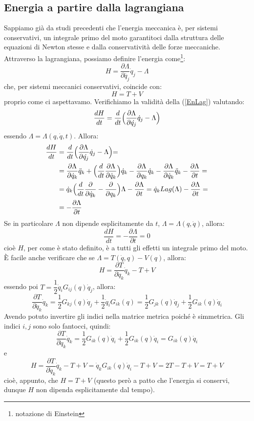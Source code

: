 \documentclass[a4paper,openany]{article}
\begin{document}
	\subsection{Energia a partire dalla lagrangiana}
	Sappiamo già da studi precedenti che l'energia meccanica è, per sistemi conservativi, un integrale primo del moto garantitoci dalla struttura delle equazioni di Newton stesse e dalla conservatività delle forze meccaniche. Attraverso la lagrangiana, possiamo definire l'energia come\footnote{notazione di Einstein}:
	\begin{equation}
		H = \dfrac{\partial \Lambda}{\partial \dot{q_{j}}} \dot{q}_{j} - \Lambda 
		\label{EnLag}
	\end{equation}
	che, per sistemi meccanici conservativi, coincide con:
	$$
	H = T + V
	$$
	proprio come ci aspettavamo. Verifichiamo la validità della (\ref{EnLag}) valutando:
	\begin{align}
		\dfrac{dH}{dt} = \dfrac{d}{dt}\Bigl(\dfrac{\partial \Lambda}{\partial \dot{q_{j}}} \dot{q}_{j} - \Lambda\Bigl)
	\end{align}
	essendo $\Lambda = \Lambda(q,\dot{q},t)$. Allora:
	\begin{align}
		\dfrac{dH}{dt} &= \dfrac{d}{dt}\Bigl(\dfrac{\partial \Lambda}{\partial \dot{q_{j}}} \dot{q}_{j} - \Lambda\Bigl) = \\
		&= \dfrac{\partial \Lambda}{\partial \dot{q}_{k}}\ddot{q}_{k} + \Bigl(\dfrac{d}{dt}\dfrac{\partial \Lambda}{\partial \dot{q}_{k}}\Bigl)\dot{q}_{k} - \dfrac{\partial \Lambda}{\partial q_{k}}\dot{q}_{k} - \dfrac{\partial \Lambda}{\partial \dot{q}_{k}}\ddot{q}_{k} - \dfrac{\partial \Lambda}{\partial t} = \\
		&= \dot{q}_{k}\Bigl(\dfrac{d}{dt}\dfrac{\partial}{\partial \dot{q}_{k}} - \dfrac{\partial}{\partial q_{k}}\Bigl)\Lambda - \dfrac{\partial \Lambda}{\partial t} = \dot{q}_{k} Lag(\Lambda) - \dfrac{\partial \Lambda}{\partial t} = \\
		&= -\dfrac{\partial \Lambda}{\partial t}
	\end{align}
	Se in particolare $\Lambda$ non dipende esplicitamente da $t$, $\Lambda = \Lambda(q,\dot{q})$, allora:
	$$
	\dfrac{dH}{dt} = -\dfrac{\partial \Lambda}{\partial t} = 0
	$$
	cioè $H$, per come è stato definito, è a tutti gli effetti un integrale primo del moto. È facile anche verificare che se $\Lambda = T(\dot{q},q) - V(q)$, allora:
	$$
	H =  \dfrac{\partial T}{\partial \dot{q}_{k}}\dot{q}_{k} - T + V
	$$
	essendo poi $T = \dfrac{1}{2}\dot{q}_{i}G_{ij}(q)\dot{q}_{j}$, allora:
	$$
	\dfrac{\partial T}{\partial \dot{q}_{k}}\dot{q}_{k} = \dfrac{1}{2}G_{kj}(q)\dot{q}_{j} + \dfrac{1}{2}\dot{q}_{i}G_{ik}(q) =  \dfrac{1}{2}G_{jk}(q)\dot{q}_{j} + \dfrac{1}{2}G_{ik}(q)\dot{q}_{i}
	$$
	Avendo potuto invertire gli indici nella matrice metrica poiché è simmetrica. Gli indici $i,j$ sono solo fantocci, quindi:
	$$
	\dfrac{\partial T}{\partial \dot{q}_{k}}\dot{q}_{k} =  \dfrac{1}{2}G_{ik}(q)\dot{q}_{i} + \dfrac{1}{2}G_{ik}(q)\dot{q}_{i} = G_{ik}(q)\dot{q}_{i}
	$$
	e 
	$$
	H =  \dfrac{\partial T}{\partial \dot{q}_{k}}\dot{q}_{k} - T + V = \dot{q}_{k}G_{ik}(q)\dot{q}_{i} - T + V = 2T - T + V = T + V
	$$
	cioè, appunto, che $H = T+V$ (questo però a patto che l'energia si conservi, dunque $H$ non dipenda esplicitamente dal tempo).
\end{document}
